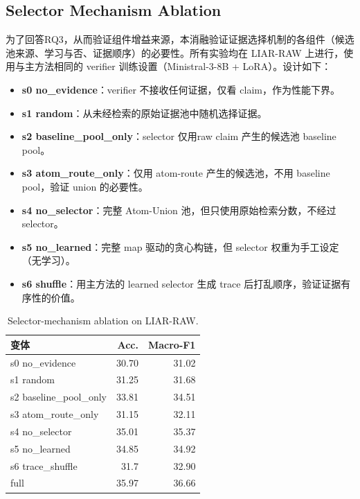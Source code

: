 \documentclass[letterpaper]{article}
\begin{document}
\FloatBarrier
\subsection{Selector Mechanism Ablation}

为了回答RQ3，从而验证组件增益来源，本消融验证证据选择机制的各组件（候选池来源、学习与否、证据顺序）的必要性。所有实验均在 LIAR-RAW 上进行，使用与主方法相同的 verifier 训练设置（Ministral-3-8B + LoRA）。设计如下：

\begin{itemize}
\item \textbf{s0 no\_evidence}：verifier 不接收任何证据，仅看 claim，作为性能下界。
\item \textbf{s1 random}：从未经检索的原始证据池中随机选择证据。
\item \textbf{s2 baseline\_pool\_only}：selector 仅用raw claim 产生的候选池 baseline pool。
\item \textbf{s3 atom\_route\_only}：仅用 atom-route 产生的候选池，不用 baseline pool，验证 union 的必要性。
\item \textbf{s4 no\_selector}：完整 Atom-Union 池，但只使用原始检索分数，不经过selector。
\item \textbf{s5 no\_learned}：完整 map 驱动的贪心构链，但 selector 权重为手工设定（无学习）。
\item \textbf{s6 shuffle}：用主方法的 learned selector 生成 trace 后打乱顺序，验证证据有序性的价值。
\end{itemize}

\begin{table}[t]
\centering
\small
\setlength{\tabcolsep}{3pt}
\renewcommand{\arraystretch}{1.08}
\caption{Selector-mechanism ablation on LIAR-RAW.}
\label{tab:selector-ablation}
\begin{tabularx}{\columnwidth}{@{}Y r r@{}}
\toprule
\textbf{变体} & \textbf{Acc.} & \textbf{Macro-F1} \\
\midrule
s0 no\_evidence & 30.70 & 31.02 \\
s1 random & 31.25 & 31.68 \\
s2 baseline\_pool\_only & 33.81 & 34.51 \\
s3 atom\_route\_only & 31.15 & 32.11 \\
s4 no\_selector & 35.01 & 35.37 \\
s5 no\_learned & 34.85 & 34.92 \\
s6 trace\_shuffle & 31.7 & 32.90 \\
full & 35.97 & 36.66 \\
\bottomrule
\end{tabularx}
\end{table}
\end{document}
